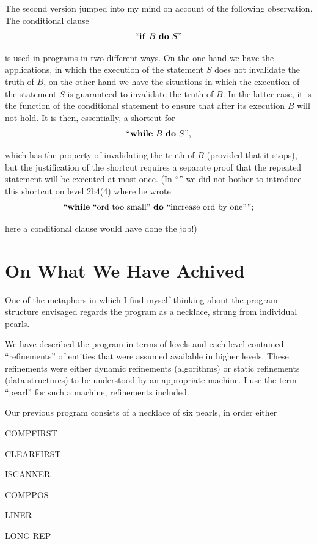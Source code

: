 \documentclass[twoside,11pt]{book}
\begin{document}
The second version jumped into my mind on account of the following observation. The conditional clause
$$
\text{``\textbf{if} } B \text{ \textbf{do} } S\text{''}
$$

\noindent
is used in programs in two different ways. On the one hand we have the applications, in which the execution of the statement $S$ does not invalidate the truth of $B$, on the other hand we have the situations in which the execution of the statement $S$ is guaranteed to invalidate the truth of $B$. In the latter case, it is the function of the conditional statement to ensure that after its execution $B$ will not hold. It is then, essentially, a shortcut for
$$
\text{``\textbf{while} } B \text{ \textbf{do} } S\text{'',}
$$

\noindent
which has the property of invalidating the truth of $B$ (provided that it stops), but the justification of the shortcut requires a separate proof that the repeated statement will be executed at most once. (In ``'' we did not bother to introduce this shortcut on level 2b4(4) where he wrote
$$
\text{``\textbf{while} ``ord too small'' \textbf{do} ``increase ord by one'''';}
$$

\noindent
here a conditional clause would have done the job!)

\section[On what we have achived]{On What We Have Achived}

One of the metaphors in which I find myself thinking about the program structure envisaged regards the program as a necklace, strung from individual pearls.

We have described the program in terms of levels and each level contained ``refinements'' of entities that were assumed available in higher levels. These refinements were either dynamic refinements (algorithms) or static refinements (data structures) to be understood by an appropriate machine. I use the term ``pearl'' for such a machine, refinements included.

Our previous program consists of a necklace of six pearls, in order either

COMPFIRST

CLEARFIRST

ISCANNER

COMPPOS

LINER

LONG REP
\end{document}

